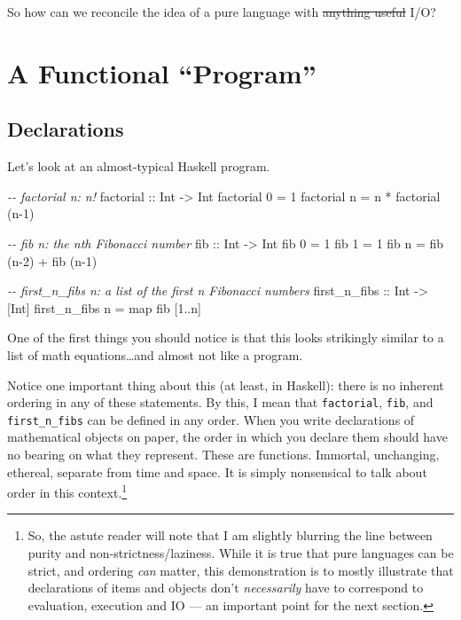 \documentclass[]{article}
\newenvironment{Shaded}{}{}
\newcommand{\CommentTok}[1]{\textcolor[rgb]{0.38,0.63,0.69}{\textit{#1}}}
\newcommand{\DataTypeTok}[1]{\textcolor[rgb]{0.56,0.13,0.00}{#1}}
\newcommand{\DecValTok}[1]{\textcolor[rgb]{0.25,0.63,0.44}{#1}}
\newcommand{\FunctionTok}[1]{\textcolor[rgb]{0.02,0.16,0.49}{#1}}
\newcommand{\NormalTok}[1]{#1}
\newcommand{\OperatorTok}[1]{\textcolor[rgb]{0.40,0.40,0.40}{#1}}
\newcommand{\OtherTok}[1]{\textcolor[rgb]{0.00,0.44,0.13}{#1}}
\begin{document}
So how can we reconcile the idea of a pure language with \st{anything useful}
I/O?

\section{A Functional ``Program''}\label{a-functional-program}

\subsection{Declarations}\label{declarations}

Let's look at an almost-typical Haskell program.

\begin{Shaded}
\begin{Highlighting}[]
\CommentTok{{-}{-}  factorial n: n!}
\OtherTok{factorial ::} \DataTypeTok{Int} \OtherTok{{-}\textgreater{}} \DataTypeTok{Int}
\NormalTok{factorial }\DecValTok{0} \OtherTok{=} \DecValTok{1}
\NormalTok{factorial n }\OtherTok{=}\NormalTok{ n }\OperatorTok{*}\NormalTok{ factorial (n}\OperatorTok{{-}}\DecValTok{1}\NormalTok{)}

\CommentTok{{-}{-}  fib n: the nth Fibonacci number}
\OtherTok{fib ::} \DataTypeTok{Int} \OtherTok{{-}\textgreater{}} \DataTypeTok{Int}
\NormalTok{fib }\DecValTok{0} \OtherTok{=} \DecValTok{1}
\NormalTok{fib }\DecValTok{1} \OtherTok{=} \DecValTok{1}
\NormalTok{fib n }\OtherTok{=}\NormalTok{ fib (n}\OperatorTok{{-}}\DecValTok{2}\NormalTok{) }\OperatorTok{+}\NormalTok{ fib (n}\OperatorTok{{-}}\DecValTok{1}\NormalTok{)}

\CommentTok{{-}{-}  first\_n\_fibs n: a list of the first n Fibonacci numbers}
\OtherTok{first\_n\_fibs ::} \DataTypeTok{Int} \OtherTok{{-}\textgreater{}}\NormalTok{ [}\DataTypeTok{Int}\NormalTok{]}
\NormalTok{first\_n\_fibs n }\OtherTok{=} \FunctionTok{map}\NormalTok{ fib [}\DecValTok{1}\OperatorTok{..}\NormalTok{n]}
\end{Highlighting}
\end{Shaded}

One of the first things you should notice is that this looks strikingly similar
to a list of math equations\ldots and almost not like a program.

Notice one important thing about this (at least, in Haskell): there is no
inherent ordering in any of these statements. By this, I mean that
\texttt{factorial}, \texttt{fib}, and \texttt{first\_n\_fibs} can be defined in
any order. When you write declarations of mathematical objects on paper, the
order in which you declare them should have no bearing on what they represent.
These are functions. Immortal, unchanging, ethereal, separate from time and
space. It is simply nonsensical to talk about order in this context.\footnote{So,
  the astute reader will note that I am slightly blurring the line between
  purity and non-strictness/laziness. While it is true that pure languages can
  be strict, and ordering \emph{can} matter, this demonstration is to mostly
  illustrate that declarations of items and objects don't \emph{necessarily}
  have to correspond to evaluation, execution and IO --- an important point for
  the next section.}
\end{document}

